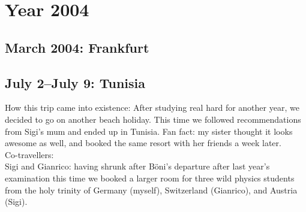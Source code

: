 \chapter{Year 2004}
\label{2004}

\section{March 2004: Frankfurt}
\label{2004:Frankfurt}

\section{July 2--July 9: Tunisia}
\label{2004:Tunisia}

How this trip came into existence: After studying real hard for another year, we decided to go on another beach holiday. This time we followed recommendations from Sigi's mum and ended up in Tunisia. Fan fact: my sister thought it looks awesome as well, and booked the same resort with her friends a week later.\\

Co-travellers:\\
Sigi and Gianrico: having shrunk after B\"oni's departure after last year's examination this time we booked a larger room for three wild physics students from the holy trinity of Germany (myself), Switzerland (Gianrico), and Austria (Sigi).

